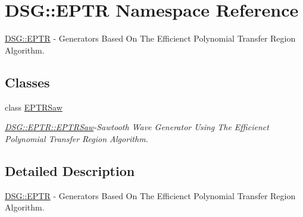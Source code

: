 \hypertarget{namespace_d_s_g_1_1_e_p_t_r}{\section{D\+S\+G\+:\+:E\+P\+T\+R Namespace Reference}
\label{namespace_d_s_g_1_1_e_p_t_r}
}


\hyperlink{namespace_d_s_g_1_1_e_p_t_r}{D\+S\+G\+::\+E\+P\+T\+R} -\/ Generators Based On The Efficienct Polynomial Transfer Region Algorithm.  


\subsection*{Classes}
\begin{DoxyCompactItemize}
\item 
class \hyperlink{class_d_s_g_1_1_e_p_t_r_1_1_e_p_t_r_saw}{E\+P\+T\+R\+Saw}
\begin{DoxyCompactList}\small\item\em \hyperlink{class_d_s_g_1_1_e_p_t_r_1_1_e_p_t_r_saw}{D\+S\+G\+::\+E\+P\+T\+R\+::\+E\+P\+T\+R\+Saw}-\/\+Sawtooth Wave Generator Using The Efficienct Polynomial Transfer Region Algorithm. \end{DoxyCompactList}\end{DoxyCompactItemize}


\subsection{Detailed Description}
\hyperlink{namespace_d_s_g_1_1_e_p_t_r}{D\+S\+G\+::\+E\+P\+T\+R} -\/ Generators Based On The Efficienct Polynomial Transfer Region Algorithm. 